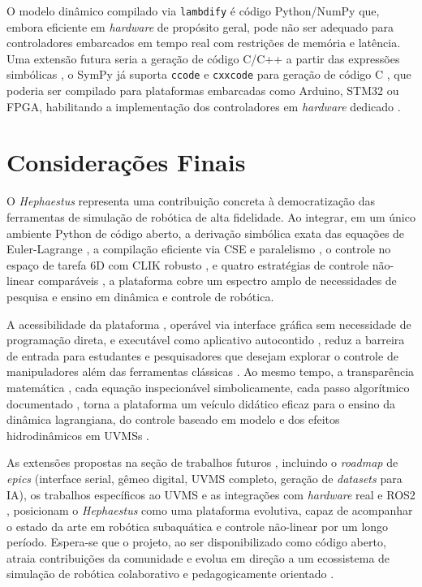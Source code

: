O modelo dinâmico compilado via \texttt{lambdify} é código Python/NumPy que, embora eficiente em \textit{hardware} de propósito geral, pode não ser adequado para controladores embarcados em tempo real com restrições de memória e latência. Uma extensão futura seria a geração de código C/C++ a partir das expressões simbólicas , o SymPy já suporta \texttt{ccode} e \texttt{cxxcode} para geração de código C , que poderia ser compilado para plataformas embarcadas como Arduino, STM32 ou FPGA, habilitando a implementação dos controladores em \textit{hardware} dedicado \cite{meurer2017sympy, leu1986automated}.

\section{Considerações Finais}

O \textit{Hephaestus} representa uma contribuição concreta à democratização das ferramentas de simulação de robótica de alta fidelidade. Ao integrar, em um único ambiente Python de código aberto, a derivação simbólica exata das equações de Euler-Lagrange \cite{craig1989introduction, siciliano2009robotics}, a compilação eficiente via CSE e paralelismo \cite{meurer2017sympy, beazley2010understanding}, o controle no espaço de tarefa 6D com CLIK robusto \cite{chiaverini1994review, nakamura1986inverse}, e quatro estratégias de controle não-linear comparáveis \cite{slotine1991applied, levant1993sliding, gao2003scaling}, a plataforma cobre um espectro amplo de necessidades de pesquisa e ensino em dinâmica e controle de robótica.

A acessibilidade da plataforma , operável via interface gráfica sem necessidade de programação direta, e executável como aplicativo autocontido , reduz a barreira de entrada para estudantes e pesquisadores que desejam explorar o controle de manipuladores além das ferramentas clássicas \cite{corke2021toolbox}. Ao mesmo tempo, a transparência matemática , cada equação inspecionável simbolicamente, cada passo algorítmico documentado , torna a plataforma um veículo didático eficaz para o ensino da dinâmica lagrangiana, do controle baseado em modelo e dos efeitos hidrodinâmicos em UVMSs \cite{antonelli2014modelling, fossen2011handbook}.

As extensões propostas na seção de trabalhos futuros , incluindo o \textit{roadmap} de \textit{epics} (interface serial, gêmeo digital, UVMS completo, geração de \textit{datasets} para IA), os trabalhos específicos ao UVMS e as integrações com \textit{hardware} real e ROS2 , posicionam o \textit{Hephaestus} como uma plataforma evolutiva, capaz de acompanhar o estado da arte em robótica subaquática e controle não-linear por um longo período. Espera-se que o projeto, ao ser disponibilizado como código aberto, atraia contribuições da comunidade e evolua em direção a um ecossistema de simulação de robótica colaborativo e pedagogicamente orientado \cite{corke2021toolbox, leu1986automated}.
